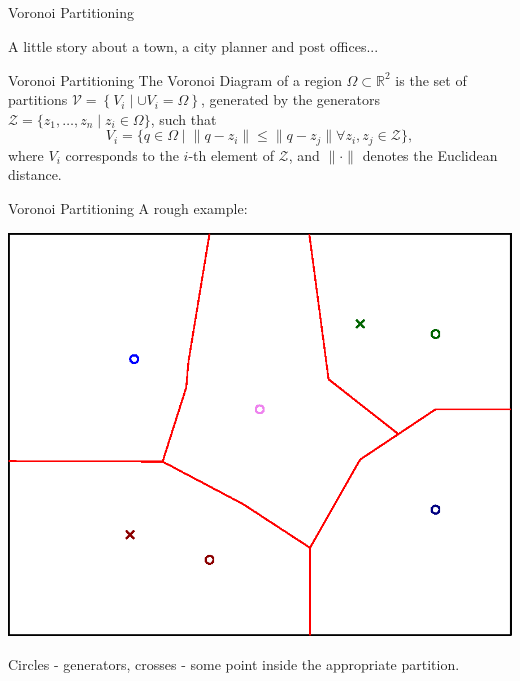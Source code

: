 \documentclass[t]{beamer}
\newcommand{\rsqr}{\mathbb{R}^2}
\begin{document}
\subsection[Voronoi Partitioning]{}
\begin{frame}[label=vorpart1]{Voronoi Partitioning}
\begin{center}
A little story about a town, a city planner and post offices...
\end{center}
\end{frame}
\begin{frame}[label=vorpart2]{Voronoi Partitioning}
The Voronoi Diagram of a region $\Omega \subset \rsqr$ is the set of partitions $\mathcal{V} = \left\{V_{i} \mid \cup V_{i} = \Omega\right\}$, generated by the generators $\mathcal{Z} = \{z_1,\ldots,z_n\mid z_{i} \in \Omega\}$, such that
\begin{equation*} \label{Voronoi Definition}
V_{i} = \{q\in\Omega \mid \lVert q - z_i \rVert \leq \lVert q - z_j \rVert \forall z_i,z_j\in\mathcal{Z}\},
\end{equation*}
where $V_{i}$ corresponds to the $i$-th element of $\mathcal{Z}$, and $\lVert \cdot \rVert$ denotes the Euclidean distance.
\end{frame}
\begin{frame}[label=vorpart3]{Voronoi Partitioning}
A rough example:
\begin{center}
\includegraphics[scale=0.6]{background/Voronoi-example.eps}
\end{center}
Circles - generators, crosses - some point inside the appropriate partition.
\end{frame}
\end{document}
